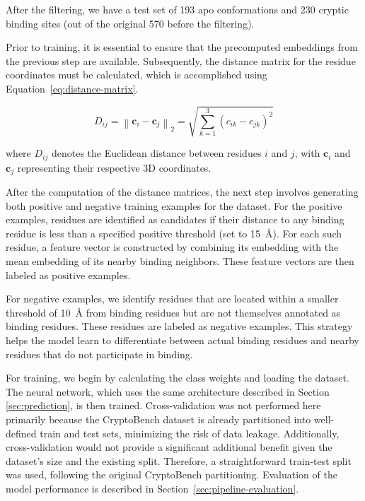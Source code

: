 After the filtering, we have a test set of 193 apo conformations and 230 cryptic binding sites (out of the original 570 before the filtering).

Prior to training, it is essential to ensure that the precomputed embeddings from the previous step are available. Subsequently, the distance matrix for the residue coordinates must be calculated, which is accomplished using Equation~\ref{eq:distance-matrix}.

\begin{equation}
D_{ij} = \left\| \mathbf{c}_i - \mathbf{c}_j \right\|_2 = \sqrt{ \sum_{k=1}^3 (c_{ik} - c_{jk})^2 }
\label{eq:distance-matrix}
\end{equation}

where $D_{ij}$ denotes the Euclidean distance between residues $i$ and $j$, with $\mathbf{c}_i$ and $\mathbf{c}_j$ representing their respective 3D coordinates.

After the computation of the distance matrices, the next step involves generating both positive and negative training examples for the dataset. For the positive examples, residues are identified as candidates if their distance to any binding residue is less than a specified positive threshold (set to 15~\AA). For each such residue, a feature vector is constructed by combining its embedding with the mean embedding of its nearby binding neighbors. These feature vectors are then labeled as positive examples.

For negative examples, we identify residues that are located within a smaller threshold of 10~\AA{} from binding residues but are not themselves annotated as binding residues. These residues are labeled as negative examples. This strategy helps the model learn to differentiate between actual binding residues and nearby residues that do not participate in binding.

For training, we begin by calculating the class weights and loading the dataset. The neural network, which uses the same architecture described in Section \ref{sec:prediction}, is then trained. Cross-validation was not performed here primarily because the CryptoBench dataset is already partitioned into well-defined train and test sets, minimizing the risk of data leakage. Additionally, cross-validation would not provide a significant additional benefit given the dataset's size and the existing split. Therefore, a straightforward train-test split was used, following the original CryptoBench partitioning. Evaluation of the model performance is described in Section~\ref{sec:pipeline-evaluation}.


